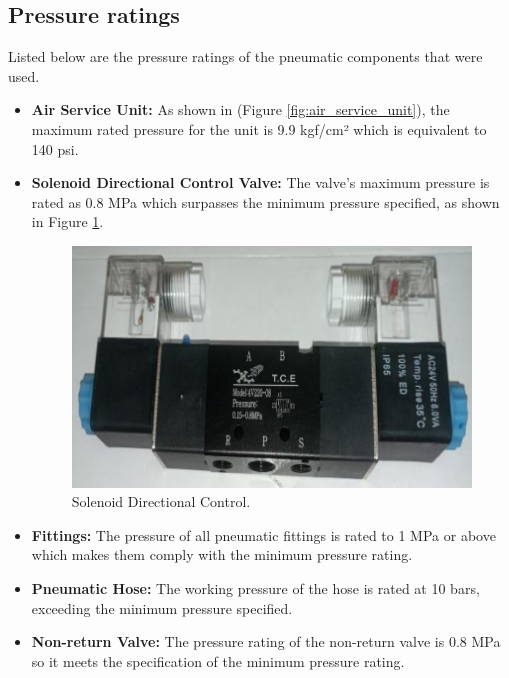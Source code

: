 \documentclass[11pt, twocolumn]{article}
\begin{document}
\subsection{Pressure ratings}

Listed below are the pressure ratings of the pneumatic components that were used.

\begin{itemize}[leftmargin=0pt, itemindent=10pt]
    \setlength{\itemsep}{0pt}
    \item \textbf{Air Service Unit:} As shown in (Figure \ref{fig:air_service_unit}), the maximum rated pressure for the unit is 9.9 kgf/cm² which is equivalent to 140 psi.
    
    \item \textbf{Solenoid Directional Control Valve:} The valve's maximum pressure is rated as 0.8 MPa which surpasses the minimum pressure specified, as shown in Figure \ref{fig:solenoid}.
    
    \begin{figure}[h!]
        \centering
        \includegraphics[width=0.8\columnwidth]{Images/Solenoid Directional Control.jpg}
        \caption{Solenoid Directional Control.}
        \label{fig:solenoid}
    \end{figure}

    \item \textbf{Fittings:} The pressure of all pneumatic fittings is rated to 1 MPa or above which makes them comply with the minimum pressure rating.

    \item \textbf{Pneumatic Hose:} The working pressure of the hose is rated at 10 bars, exceeding the minimum pressure specified. 

    \item \textbf{Non-return Valve:} The pressure rating of the non-return valve is 0.8 MPa so it meets the specification of the minimum pressure rating.
\end{itemize}
\end{document}
